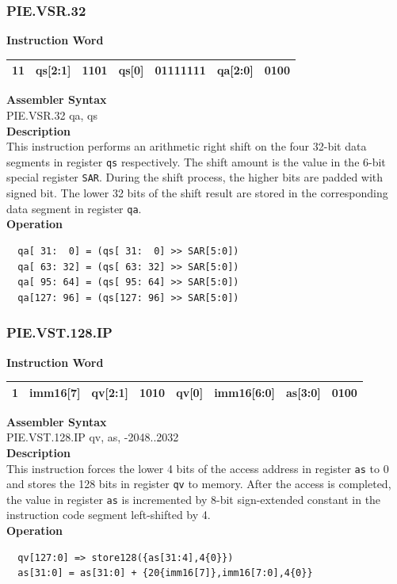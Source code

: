 \newpage
\subsubsection{PIE.VSR.32}\label{instruction:PIEVSR32}
\setlength\tabcolsep{6pt}
\textbf{Instruction Word} \\
\begin{tabular}{|c|c|c|c|c|c|c|}
	\hline
	11 & qs[2:1] & 1101 & qs[0] & 01111111 & qa[2:0] & 0100 \\
	\hline
\end{tabular}

\textbf{Assembler Syntax} \\
PIE.VSR.32 qa, qs \\
\textbf{Description} \\
This instruction performs an arithmetic right shift on the four 32-bit data segments in register \lstinline{qs} respectively. The shift amount is the value in the 6-bit special register \lstinline{SAR}. During the shift process, the higher bits are padded with signed bit. The lower 32 bits of the shift result are stored in the corresponding data segment in register \lstinline{qa}.\\
\textbf{Operation}
\begin{lstlisting}
  qa[ 31:  0] = (qs[ 31:  0] >> SAR[5:0])
  qa[ 63: 32] = (qs[ 63: 32] >> SAR[5:0])
  qa[ 95: 64] = (qs[ 95: 64] >> SAR[5:0])
  qa[127: 96] = (qs[127: 96] >> SAR[5:0])
\end{lstlisting}

\newpage
\subsubsection{PIE.VST.128.IP}\label{instruction:PIEVST128IP}
\setlength\tabcolsep{6pt}
\textbf{Instruction Word} \\
\begin{tabular}{|c|c|c|c|c|c|c|c|}
	\hline
	1 & imm16[7] & qv[2:1] & 1010 & qv[0] & imm16[6:0] & as[3:0] & 0100 \\
	\hline
\end{tabular}

\textbf{Assembler Syntax} \\
PIE.VST.128.IP qv, as, -2048..2032 \\
\textbf{Description} \\
This instruction forces the lower 4 bits of the access address in register \lstinline{as} to 0 and stores the 128 bits in register \lstinline{qv} to memory. After the access is completed, the value in register \lstinline{as} is incremented by 8-bit sign-extended constant in the instruction code segment left-shifted by 4.\\
\textbf{Operation}
\begin{lstlisting}
  qv[127:0] => store128({as[31:4],4{0}})
  as[31:0] = as[31:0] + {20{imm16[7]},imm16[7:0],4{0}}
\end{lstlisting}

